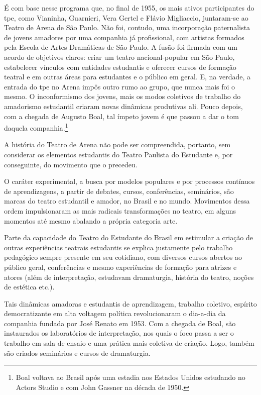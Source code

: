 É com base nesse programa que, no final de 1955, os mais ativos
participantes do {\sc tpe}, como Vianinha, Guarnieri, Vera Gertel e Flávio
Migliaccio, juntaram-se ao Teatro de Arena de São Paulo. Não foi,
contudo, uma incorporação paternalista de jovens amadores por uma
companhia já profissional, com artistas formados pela Escola de Artes
Dramáticas de São Paulo. A fusão foi firmada com um acordo de objetivos
claros: criar um teatro nacional-popular em São Paulo, estabelecer
vínculos com entidades estudantis e oferecer cursos de formação teatral
e em outras áreas para estudantes e o público em geral. E, na verdade, a
entrada do {\sc tpe} no Arena impôs outro rumo ao grupo, que nunca mais foi o
mesmo. O inconformismo dos jovens, mais os modos coletivos de trabalho
do amadorismo estudantil criaram novas dinâmicas produtivas ali. Pouco
depois, com a chegada de Augusto Boal, tal ímpeto jovem é que passou a
dar o tom daquela companhia.\footnote{Boal voltava ao Brasil após uma
  estadia nos Estados Unidos estudando no Actors Studio e com John
  Gassner na década de 1950.}

\subject{Efervescência política e cultural dos anos 1960}

A história do Teatro de Arena não pode ser compreendida, portanto, sem
considerar os elementos estudantis do Teatro Paulista do Estudante e,
por conseguinte, do movimento que o precedeu.

O caráter experimental, a busca por modelos populares e por processos
contínuos de aprendizagens, a partir de debates, cursos, conferências,
seminários, são marcas do teatro estudantil e amador, no Brasil e no
mundo. Movimentos dessa ordem impulsionaram as mais radicais
transformações no teatro, em alguns momentos até mesmo abalando a
própria categoria arte.

Parte da capacidade do Teatro do Estudante do Brasil em estimular a
criação de outras experiências teatrais estudantis se explica justamente
pelo trabalho pedagógico sempre presente em seu cotidiano, com diversos
cursos abertos ao público geral, conferências e mesmo experiências de
formação para atrizes e atores (além de interpretação, estudavam
dramaturgia, história do teatro, noções de estética etc.).

Tais dinâmicas amadoras e estudantis de aprendizagem, trabalho coletivo,
espírito democratizante em alta voltagem política revolucionaram o
dia-a-dia da companhia fundada por José Renato em 1953. Com a chegada de
Boal, são instaurados os laboratórios de interpretação, nos quais o foco
passa a ser o trabalho em sala de ensaio e uma prática mais coletiva de
criação. Logo, também são criados seminários e cursos de dramaturgia.

